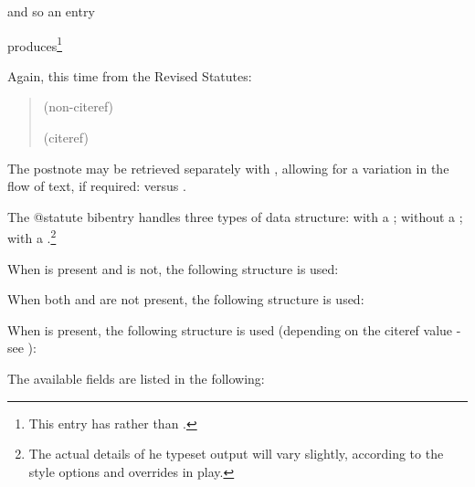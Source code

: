 \begin{quotation}
\end{quotation}
and so an entry

produces\footnote{This entry has  rather than .}
\begin{quotation}
\end{quotation}

\p Again, this time from the Revised Statutes:
\begin{quotation}
\noindent{} {\footnotesize (non-citeref)}

\noindent{} {\footnotesize (citeref)}
\end{quotation}

\p The postnote may be retrieved separately with , allowing for a variation in the flow of text, if required:  versus .

\p The @statute bibentry handles three types of data structure: with a ; without a ; with a .\footnote{The actual details of he typeset output will vary slightly, according to the style options and overrides in play.}

\p When  is present and  is not, the following structure is used:

\begin{quotation}
\end{quotation}

\p When both  and  are not present, the following structure is used:

\begin{quotation}
\end{quotation}


\p When  is present, the following structure is used (depending on the citeref value - see ):

\begin{quotation}
\end{quotation}

\p The available fields are listed in the following:

